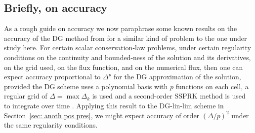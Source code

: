 \subsection{Briefly, on accuracy}
As a rough guide on accuracy we now paraphrase some known results on the accuracy of the DG method from \cite[Sections~5.5,~5.8]{nodalDGBook} for a similar kind of problem to the one under study here. For certain scalar conservation-law problems, under certain regularity conditions on the continuity and bounded-ness of the solution and its derivatives, on the grid used, on the flux function, and on the numerical flux, then one can expect accuracy proportional to \(\Delta^{p}\) for the DG approximation of the solution, provided the DG scheme uses a polynomial basis with \(p\) functions on each cell, a regular grid of \(\Delta = \max \Delta_k\) is used and a second-order SSPRK method is used to integrate over time \citep[Sections~5.5,~5.8, and references therein]{nodalDGBook}. Applying this result to the DG-lin-lim scheme in Section~\ref{sec: anoth pos pres}, we might expect accuracy of order \((\Delta/p)^2\) under the same regularity conditions.




